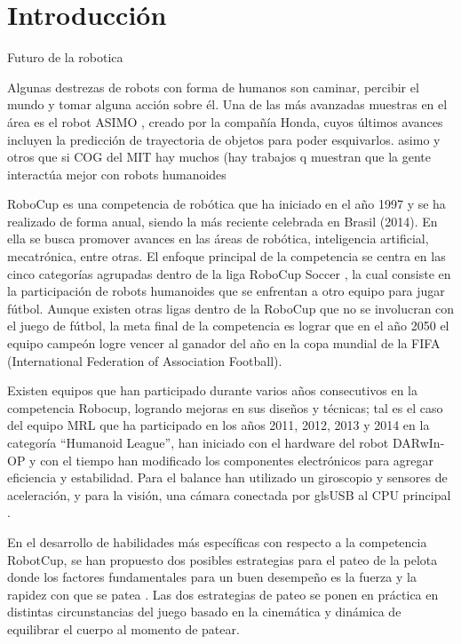 
\chapter{Introducción}\label{intro}


\label{sect:justificacion}

Futuro de la robotica

Algunas destrezas de robots con forma de humanos son caminar, percibir el mundo y tomar alguna acción sobre él. Una de las más avanzadas muestras en el área es el robot ASIMO \cite{asimo}, creado por la compañía Honda, cuyos últimos avances incluyen la predicción de trayectoria de objetos para poder esquivarlos.  asimo y otros que si COG del MIT hay muchos (hay trabajos q muestran que la gente interactúa mejor con robots humanoides

RoboCup \cite{robotcup} es una competencia de robótica que ha iniciado en el año 1997 y se ha realizado de forma anual, siendo la más reciente celebrada en Brasil (2014). En ella se busca promover avances en las áreas de robótica, inteligencia artificial, mecatrónica, entre otras. El enfoque principal de la competencia se centra en las cinco categorías agrupadas dentro de la liga RoboCup Soccer \cite{robotcupsoccer}, la cual consiste en la participación de robots humanoides que se enfrentan a otro equipo para jugar fútbol. Aunque existen otras ligas dentro de la RoboCup que no se involucran con el juego de fútbol, la meta final de la competencia es lograr que en el año 2050 el equipo campeón logre vencer al ganador del año en la copa mundial de la FIFA (International Federation of Association Football).

Existen equipos que han participado durante varios años consecutivos en la competencia Robocup, logrando mejoras en sus diseños y técnicas; tal es el caso del equipo MRL que ha participado en los años 2011, 2012, 2013 y 2014 en la categoría “Humanoid League”, han iniciado con el hardware del robot DARwIn-OP y con el tiempo han modificado los componentes electrónicos para agregar eficiencia y estabilidad. Para el balance han utilizado un giroscopio y sensores de aceleración, y para la visión, una cámara conectada por gls{USB} al CPU principal \cite{paper1}.
 
En el desarrollo de habilidades más específicas con respecto a la competencia RobotCup, se han propuesto dos posibles estrategias para el pateo de la pelota donde los factores fundamentales para un buen desempeño es la fuerza y la rapidez con que se patea \cite{paper2}. Las dos estrategias de pateo se ponen en práctica en distintas circunstancias del juego basado en la cinemática y dinámica de equilibrar el cuerpo al momento de patear.

